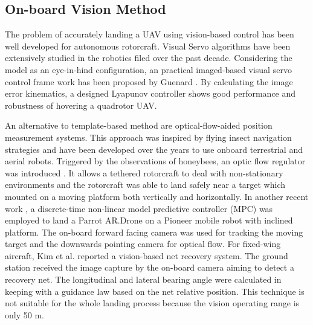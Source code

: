\subsection{On-board Vision Method}
The problem of accurately landing a UAV using vision-based control has been well developed for autonomous rotorcraft. Visual Servo algorithms have been extensively studied in the robotics filed over the past decade. Considering the model as an eye-in-hind configuration, an practical imaged-based visual servo control frame work has been proposed by Guenard \cite{Guenard2008}. By calculating the image error kinematics, a designed Lyapunov controller shows good performance and robustness of hovering a quadrotor UAV. 


An alternative to template-based method are optical-flow-aided position measurement systems. This approach was inspired by flying insect navigation strategies \cite{Green2004} and have been developed over the years to use onboard terrestrial and aerial robots. Triggered by the observations of honeybees, an optic flow regulator was introduced \cite{Ruffier2014}. It allows a tethered rotorcraft to deal with non-stationary environments and the rotorcraft was able to land safely near a target which mounted on a moving platform both vertically and horizontally. In another recent work \cite{Vlantis2015}, a discrete-time non-linear model predictive controller (MPC) was employed to land a Parrot AR.Drone on a Pioneer mobile robot with inclined platform. The on-board forward facing camera was used for tracking the moving target and the downwards pointing camera for optical flow. For fixed-wing aircraft, Kim et al.\cite{Kim2013} reported a vision-based net recovery system. The ground station received the image capture by the on-board camera aiming to detect a recovery net. The longitudinal and lateral bearing angle were calculated in keeping with a guidance law based on the net relative position. This technique is not suitable for the whole landing process because the vision operating range is only 50 m.
 


